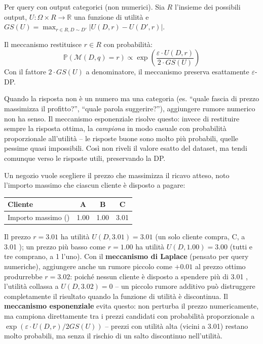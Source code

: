 \documentclass[a4paper,11pt]{article}
\begin{document}
\begin{definizione}
Per query con output categorici (non numerici). Sia $R$ l'insieme dei possibili output, $U: \Omega \times R \to \mathbb{R}$ una funzione di utilit\`{a} e $GS(U) = \max_{r \in R, D \sim D'} |U(D,r) - U(D',r)|$.

Il meccanismo restituisce $r \in R$ con probabilit\`{a}:
\[
\mathbb{P}(\mathcal{M}(D, q) = r) \propto \exp\!\left(\frac{\varepsilon \cdot U(D, r)}{2 \cdot GS(U)}\right)
\]
Con il fattore $2 \cdot GS(U)$ a denominatore, il meccanismo preserva esattamente $\varepsilon$-DP.
\end{definizione}

\begin{nota}
Quando la risposta non è un numero ma una categoria (es. ``quale fascia di prezzo massimizza il profitto?'', ``quale parola suggerire?''), aggiungere rumore numerico non ha senso. Il meccanismo esponenziale risolve questo: invece di restituire sempre la risposta ottima, la \emph{campiona} in modo casuale con probabilità proporzionale all'utilità -- le risposte buone sono molto più probabili, quelle pessime quasi impossibili. Così non riveli il valore esatto del dataset, ma tendi comunque verso le risposte utili, preservando la DP.
\end{nota}

\begin{esempio}
Un negozio vuole scegliere il prezzo che massimizza il ricavo atteso, noto l'importo massimo che ciascun cliente \`{e} disposto a pagare:
\begin{center}
\small
\begin{tabular}{lccc}
\toprule
Cliente & A & B & C \\
\midrule
Importo massimo (\texteuro{}) & 1.00 & 1.00 & 3.01 \\
\bottomrule
\end{tabular}
\end{center}
Il prezzo $r=3.01$ ha utilit\`{a} $U(D,3.01) = 3.01$ (un solo cliente compra, C, a 3.01 \texteuro{}); un prezzo pi\`{u} basso come $r=1.00$ ha utilit\`{a} $U(D,1.00)=3.00$ (tutti e tre comprano, a 1 \texteuro{} l'uno). Con il \textbf{meccanismo di Laplace} (pensato per query numeriche), aggiungere anche un rumore piccolo come $+0.01$ al prezzo ottimo produrrebbe $r=3.02$: poich\'{e} nessun cliente \`{e} disposto a spendere pi\`{u} di 3.01 \texteuro{}, l'utilit\`{a} collassa a $U(D,3.02)=0$ -- un piccolo rumore additivo pu\`{o} distruggere completamente il risultato quando la funzione di utilit\`{a} \`{e} discontinua. Il \textbf{meccanismo esponenziale} evita questo: non perturba il prezzo numericamente, ma campiona direttamente tra i prezzi candidati con probabilit\`{a} proporzionale a $\exp(\varepsilon \cdot U(D,r)/2GS(U))$ -- prezzi con utilit\`{a} alta (vicini a 3.01) restano molto probabili, ma senza il rischio di un salto discontinuo nell'utilit\`{a}.
\end{esempio}
\end{document}

